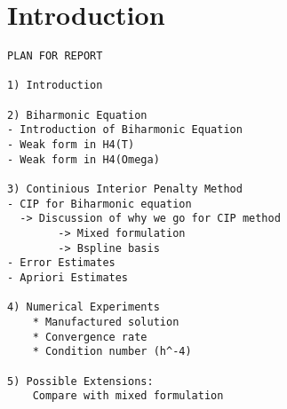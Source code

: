 \section{Introduction}\label{sec:introduction}




\begin{verbatim}
PLAN FOR REPORT

1) Introduction

2) Biharmonic Equation
- Introduction of Biharmonic Equation
- Weak form in H4(T)
- Weak form in H4(Omega)

3) Continious Interior Penalty Method
- CIP for Biharmonic equation
  -> Discussion of why we go for CIP method
        -> Mixed formulation
        -> Bspline basis
- Error Estimates
- Apriori Estimates

4) Numerical Experiments
    * Manufactured solution
    * Convergence rate
    * Condition number (h^-4)

5) Possible Extensions:
    Compare with mixed formulation
\end{verbatim}







